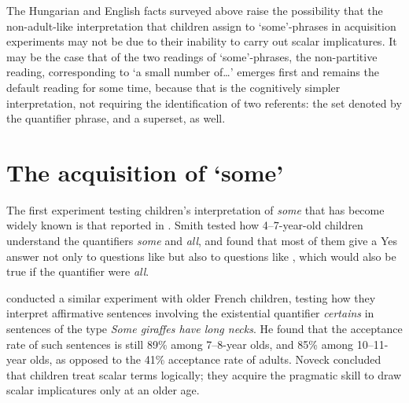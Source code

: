\documentclass[output=paper]{langscibook}
\begin{document}

\noindent The Hungarian and English facts surveyed above raise the possibility that the non-adult-like interpretation that children assign to `some'-phrases in acquisition experiments may not be due to their inability to carry out scalar implicatures. It may be the case that of the two readings of `some'-phrases, the non-partitive reading, corresponding to `a small number of\dots' emerges first and remains the default reading for some time, because that is the cognitively simpler interpretation, not requiring the identification of two referents: the set denoted by the quantifier phrase, and a superset, as well. 

\section{The acquisition of `some'}\label{kis-zet:sec:acquisition} 

The first experiment testing children’s interpretation of \textit{some} that has become widely known is that reported in \citet{smith1980quantifiers}. Smith tested how 4--7-year-old children understand the quantifiers \textit{some} and \textit{all}, and found that most of them give a Yes answer not only to questions like  but also to questions like , which would also be true if the quantifier were \textit{all}. 

\eal
{}
\zl

\noindent \citet{noveck2001children} conducted a similar experiment with older French children, testing how they interpret affirmative sentences involving the existential quantifier \textit{certains} in sentences of the type \textit{Some giraffes have long necks}. He found that the acceptance rate of such sentences is still 89\% among 7--8-year olds, and 85\% among 10--11-year olds, as opposed to the 41\% acceptance rate of adults. Noveck concluded that children treat scalar terms logically; they acquire the pragmatic skill to draw scalar implicatures only at an older age.
\end{document}
